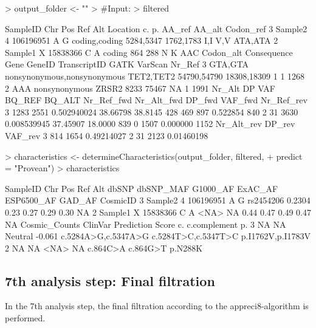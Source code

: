 \documentclass{article}
\begin{document}
\begin{Schunk}
\begin{Sinput}
> output_folder <- ""
> #Input:
> filtered
\end{Sinput}
\begin{Soutput}
  SampleID Chr       Pos Ref Alt      Location        c.        p. AA_ref AA_alt Codon_ref
3  Sample2   4 106196951   A   G coding,coding 5284,5347 1762,1783    I,I    V,V   ATA,ATA
2  Sample1   X  15838366   C   A        coding       864       288      N      K       AAC
  Codon_alt                 Consequence      Gene      GeneID TranscriptID GATK VarScan Nr_Ref
3   GTA,GTA nonsynonymous,nonsynonymous TET2,TET2 54790,54790  18308,18309    1       1   1268
2       AAA               nonsynonymous     ZRSR2        8233        75467   NA       1   1991
  Nr_Alt   DP         VAF   BQ_REF  BQ_ALT Nr_Ref_fwd Nr_Alt_fwd DP_fwd  VAF_fwd Nr_Ref_rev
3   1283 2551 0.502940024 38.66798 38.8145        428        469    897 0.522854        840
2     31 3630 0.008539945 37.45907 18.0000        839          0   1507 0.000000       1152
  Nr_Alt_rev DP_rev    VAF_rev
3        814   1654 0.49214027
2         31   2123 0.01460198
\end{Soutput}
\begin{Sinput}
> characteristics <- determineCharacteristics(output_folder, filtered,
+                                             predict = "Provean")
> characteristics
\end{Sinput}
\begin{Soutput}
  SampleID Chr       Pos Ref Alt     dbSNP dbSNP_MAF G1000_AF ExAC_AF ESP6500_AF GAD_AF CosmicID
3  Sample2   4 106196951   A   G rs2454206    0.2304     0.23    0.27       0.29   0.30       NA
2  Sample1   X  15838366   C   A      <NA>        NA     0.44    0.47       0.49   0.47       NA
  Cosmic_Counts ClinVar Prediction  Score                  c.        c.complement                p.
3            NA      NA    Neutral -0.061 c.5284A>G,c.5347A>G c.5284T>C,c.5347T>C p.I1762V,p.I1783V
2            NA      NA       <NA>     NA            c.864C>A            c.864G>T           p.N288K
\end{Soutput}
\end{Schunk}

\subsection{7th analysis step: Final filtration}

In the 7th analysis step, the final filtration according to the appreci8-algorithm is performed.
\end{document}
